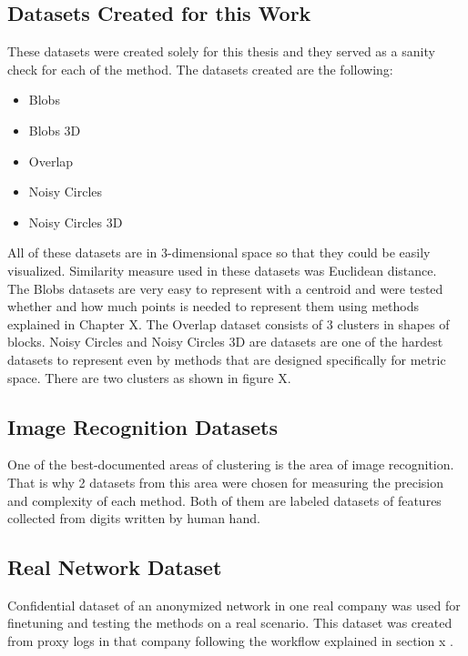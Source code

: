 \documentclass[thesis=B,english]{FITthesis}[2012/10/20]
\begin{document}
\subsection{Datasets Created for this Work}

These datasets were created solely for this thesis and they served as a sanity check for each of the method.
The datasets created are the following:
\begin{itemize}
    \item Blobs
    \item Blobs 3D
    \item Overlap
    \item Noisy Circles
    \item Noisy Circles 3D
\end{itemize}
All of these datasets are in 3-dimensional space so that they could be easily visualized. 
Similarity measure used in these datasets was Euclidean distance. \\

The Blobs datasets are very easy to represent with a centroid and were tested whether and how much points is needed to represent them using methods explained in Chapter X.  The Overlap dataset consists of 3 clusters in shapes of blocks. Noisy Circles and Noisy Circles 3D are datasets are one of the hardest datasets to represent even by methods that are designed specifically for metric space.
There are two clusters as shown in figure X. 

\subsection{Image Recognition Datasets}
One of the best-documented areas of clustering is the area of image recognition.
That is why 2 datasets from this area were chosen for measuring the precision and complexity of each method. Both of them are labeled datasets of features collected from digits written by human hand. \\


\subsection{Real Network Dataset}
Confidential dataset of an anonymized network in one real company was used for finetuning and testing the methods on a real scenario.
This dataset was created from proxy logs in that company following the workflow explained in section x . \\
\end{document}
